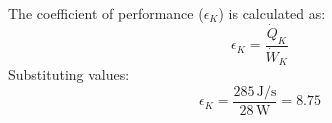 The coefficient of performance (\( \epsilon_K \)) is calculated as:  
\[
\epsilon_K = \frac{\dot{Q}_K}{\dot{W}_K}
\]  
Substituting values:  
\[
\epsilon_K = \frac{285 \, \text{J/s}}{28 \, \text{W}} = 8.75
\]